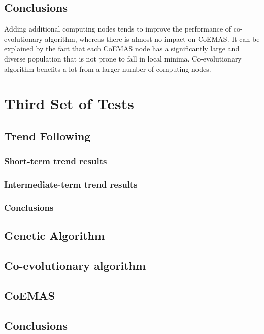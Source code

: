 \subsection{Conclusions}

Adding additional computing nodes tends to improve the performance of co-evolutionary algorithm, whereas there is almost no impact on CoEMAS.
It can be explained by the fact that each CoEMAS node has a significantly large and diverse population that is not prone to fall in local minima.
Co-evolutionary algorithm benefits a lot from a larger number of computing nodes.  

\section{Third Set of Tests}

\subsection{Trend Following}

\subsubsection{Short-term trend results}
\subsubsection{Intermediate-term trend results}
\subsubsection{Conclusions}

\subsection{Genetic Algorithm}

\subsection{Co-evolutionary algorithm}

\subsection{CoEMAS}


\subsection{Conclusions}